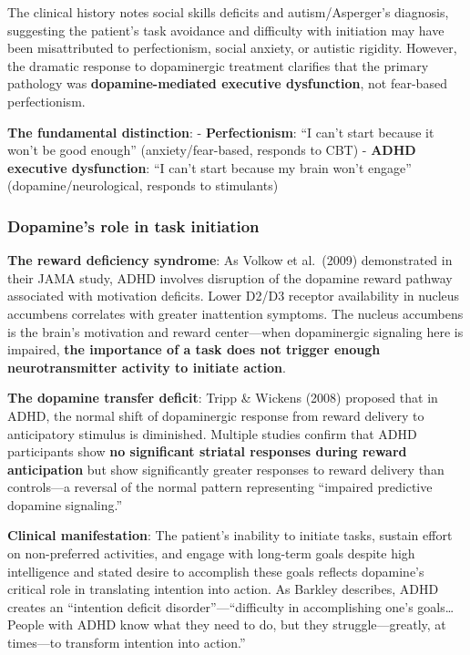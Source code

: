The clinical history notes social skills deficits and autism/Asperger's diagnosis, suggesting the patient's task avoidance and difficulty with initiation may have been misattributed to perfectionism, social anxiety, or autistic rigidity. However, the dramatic response to dopaminergic treatment clarifies that the primary pathology was \textbf{dopamine-mediated executive dysfunction}, not fear-based perfectionism.

\textbf{The fundamental distinction}: - \textbf{Perfectionism}: ``I can't start because it won't be good enough'' (anxiety/fear-based, responds to CBT) - \textbf{ADHD executive dysfunction}: ``I can't start because my brain won't engage'' (dopamine/neurological, responds to stimulants)

\subsubsection{Dopamine's role in task initiation}\label{10a_trd_basis-dopamines-role-in-task-initiation}

\textbf{The reward deficiency syndrome}: As Volkow et al.~(2009) demonstrated in their JAMA study, ADHD involves disruption of the dopamine reward pathway associated with motivation deficits. Lower D2/D3 receptor availability in nucleus accumbens correlates with greater inattention symptoms. The nucleus accumbens is the brain's motivation and reward center---when dopaminergic signaling here is impaired, \textbf{the importance of a task does not trigger enough neurotransmitter activity to initiate action}.

\textbf{The dopamine transfer deficit}: Tripp \& Wickens (2008) proposed that in ADHD, the normal shift of dopaminergic response from reward delivery to anticipatory stimulus is diminished. Multiple studies confirm that ADHD participants show \textbf{no significant striatal responses during reward anticipation} but show significantly greater responses to reward delivery than controls---a reversal of the normal pattern representing ``impaired predictive dopamine signaling.''

\textbf{Clinical manifestation}: The patient's inability to initiate tasks, sustain effort on non-preferred activities, and engage with long-term goals despite high intelligence and stated desire to accomplish these goals reflects dopamine's critical role in translating intention into action. As Barkley describes, ADHD creates an ``intention deficit disorder''---``difficulty in accomplishing one's goals\ldots{} People with ADHD know what they need to do, but they struggle---greatly, at times---to transform intention into action.''

